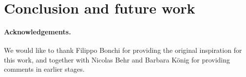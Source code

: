 \section{Conclusion and future work}





\paragraph{Acknowledgements.}
We would like to thank Filippo Bonchi for providing the original inspiration for this work, and together with Nicolas Behr and Barbara König for providing comments in earlier stages.
